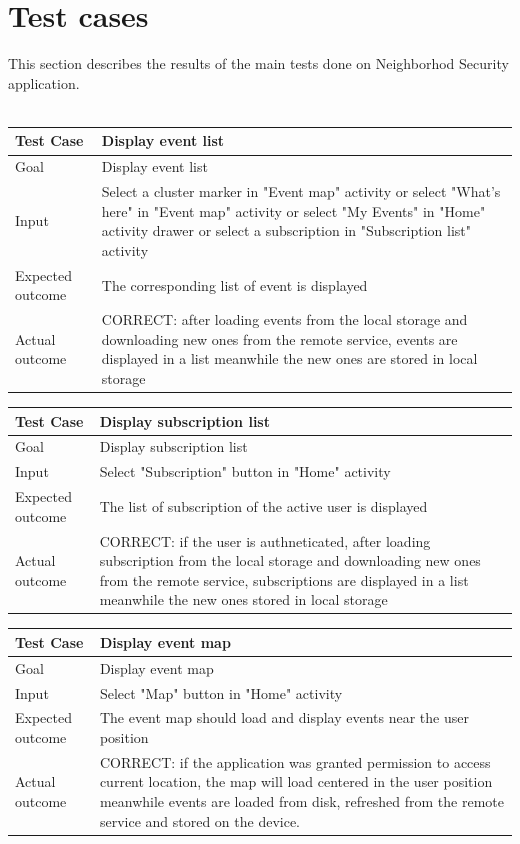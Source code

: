 \documentclass[a4paper]{scrreprt}
\begin{document}
\chapter{Test cases}
This section describes the results of the main tests done on Neighborhod Security application.\\\\
\bigskip
\noindent
\begin{tabularx}{\linewidth}{|l|X|}
	\hline
	\textbf{Test Case} 	& \textbf{Display event list} \\ \hline
	Goal 				& Display event list \\ \hline
	Input 				& Select a cluster marker in  "Event map" activity or select "What's here" in  "Event map" activity or select "My Events" in "Home" activity drawer or select a subscription in "Subscription list" activity \\ \hline
	Expected outcome 	& The corresponding list of event is displayed \\ \hline
	Actual outcome 		& CORRECT: after loading events from the local storage and downloading new ones from the remote service, events are displayed in a list meanwhile the new ones are stored in local storage \\ \hline
\end{tabularx}
\bigskip
\noindent
\begin{tabularx}{\linewidth}{|l|X|}
	\hline
	\textbf{Test Case} 	& \textbf{Display subscription list} \\ \hline
	Goal 				& Display subscription list \\ \hline
	Input 				& Select "Subscription" button in "Home" activity \\ \hline
	Expected outcome 	& The list of subscription of the active user is displayed \\ \hline
	Actual outcome 		& CORRECT: if the user is authneticated, after loading subscription from the local storage and downloading new ones from the remote service, subscriptions are displayed in a list meanwhile the new ones stored in local storage \\ \hline
\end{tabularx}
\bigskip
\noindent
\begin{tabularx}{\linewidth}{|l|X|}
	\hline
	\textbf{Test Case} 	& \textbf{Display event map} \\ \hline
	Goal 				& Display event map \\ \hline
	Input 				& Select "Map" button in "Home" activity \\ \hline
	Expected outcome 	& The event map should load and display events near the user position \\ \hline
	Actual outcome 		& CORRECT: if the application was granted permission to access current location, the map will load centered in the user position meanwhile events are loaded from disk, refreshed from the remote service and stored on the device. \\ \hline
\end{tabularx}
\end{document}
